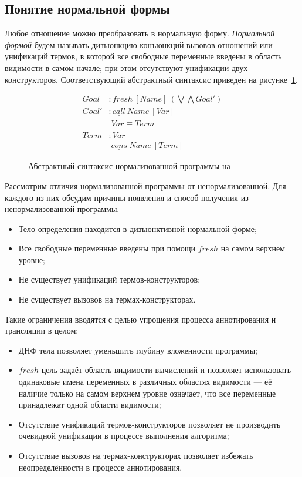 \subsection{Понятие нормальной формы}

Любое отношение \miniKanren{} можно преобразовать в нормальную форму.
\emph{Нормальной формой} будем называть дизъюнкцию конъюнкций вызовов отношений или унификаций термов, в которой все свободные переменные введены в область видимости в самом начале; при этом отсутствуют унификации двух конструкторов.
Соответствующий абстрактный синтаксис приведен на рисунке~\ref{fig:normmk}.

\begin{figure}
    \begin{align*}
      Goal  &: \underline{fresh} \ [Name] \ (\bigvee \bigwedge Goal') \\
      Goal' &: \underline{call} \ Name \ [Var] \\
            &\mid Var \equiv Term \\
      Term  &: Var \\ 
            &\mid \underline{cons} \ Name \ [Term]
    \end{align*}
    \caption{Абстрактный синтаксис нормализованной программы на \miniKanren{}}
    \label{fig:normmk}
\end{figure}

Рассмотрим отличия нормализованной программы от ненормализованной.
Для каждого из них обсудим причины появления и способ получения из ненормализованной программы.
\begin{itemize}
    \item Тело определения находится в дизъюнктивной нормальной форме;
    \item Все свободные переменные введены при помощи $fresh$ на самом верхнем уровне;
    \item Не существует унификаций термов-конструкторов;
    \item Не существует вызовов на термах-конструкторах.
\end{itemize}

Такие ограничения вводятся с целью упрощения процесса аннотирования и трансляции в целом:
\begin{itemize}
    \item ДНФ тела позволяет уменьшить глубину вложенности программы;
    \item $fresh$-цель задаёт область видимости вычислений и позволяет использовать одинаковые имена переменных в различных областях видимости --- её наличие только на самом верхнем уровне означает, что все переменные принадлежат одной области видимости;
    \item Отсутствие унификаций термов-конструкторов позволяет не производить очевидной унификации в процессе выполнения алгоритма;
    \item Отсутствие вызовов на термах-конструкторах позволяет избежать неопределённости в процессе аннотирования.
\end{itemize}


